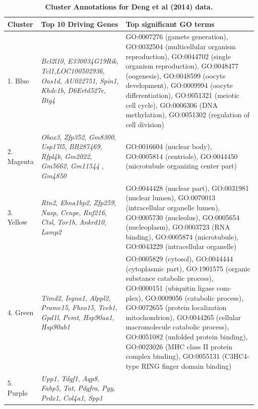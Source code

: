 \documentclass[10pt,letterpaper]{article}
\begin{document}
\begin{table}[!hp]
\begin{adjustwidth}{-2in}{0in} %
\footnotesize
\centering
\caption{\bf Cluster Annotations for Deng et al (2014) data.}
\renewcommand{\arraystretch}{1.7}
\begin{tabular}{|p{1.0in}|p{1.5in}|p{4.3in}|}
\hline
Cluster & Top 10 Driving \qquad Genes &  Top significant GO terms \\
\hline
1. Blue & \textit{Bcl2l10}, \textit{E330034G19Rik}, \textit{Tcl1},\textit{LOC100502936}, \textit{Oas1d}, \textit{AU022751}, \textit{Spin1}, \textit{Khdc1b}, \textit{D6Ertd527e}, \textit{Btg4} & GO:0007276 (gamete generation), GO:0032504 (multicellular organism reproduction), GO:0044702 (single organism reproduction), GO:0048477 (oogenesis), GO:0048599 (oocyte development), GO:0009994 (oocyte differentiation), GO:0051321 (meiotic cell cycle), GO:0006306 (DNA methylation), GO:0051302 (regulation of cell division)\\
\hline
2. Magenta & \textit{Obox3}, \textit{Zfp352}, \textit{Gm8300}, \textit{Usp17l5}, \textit{BB287469}, \textit{Rfpl4b}, \textit{Gm2022}, \textit{Gm5662}, \textit{Gm11544 }, \textit{Gm4850}
& GO:0016604 (nuclear body), GO:0005814 (centriole), GO:0044450 (microtubule organizing center part) \\
\hline
3. Yellow & \textit{Rtn2}, \textit{Ebna1bp2}, \textit{Zfp259}, \textit{Nasp}, \textit{Cenpe}, \textit{Rnf216}, \textit{Ctsl}, \textit{Tor1b}, \textit{Ankrd10}, \textit{Lamp2} & GO:0044428 (nuclear part), GO:0031981 (nuclear lumen), GO:0070013 (intracellular organelle lumen), GO:0005730 (nucleolus), GO:0005654 (nucleoplasm),  GO:0003723 (RNA binding), GO:0005874 (microtubule), GO:0043229 (intracellular organelle)\\
\hline
4. Green
&  \textit{Timd2}, \textit{Isyna1}, \textit{Alppl2}, \textit{Prame15},  \textit{Fbxo15}, \textit{Tceb1}, \textit{Gpd1l}, \textit{Pemt}, \textit{Hsp90aa1}, \textit{Hsp90ab1}
& GO:0005829 (cytosol), GO:0044444 (cytoplasmic part), GO:1901575 (organic substance catabolic process), GO:0000151 (ubiquitin ligase com- plex),  GO:0009056 (catabolic process), GO:0072655 (protein localization mitochondrion), GO:0044265 (cellular macromolecule catabolic process), GO:0051082 (unfolded protein binding), GO:0023026 (MHC class II protein complex binding), GO:0055131 (C3HC4-type RING finger domain binding) \\
\hline
5. Purple & \textit{Upp1}, \textit{Tdgf1}, \textit{Aqp8}, \textit{Fabp5}, \textit{Tat}, \textit{Pdgfra}, \textit{Pyy}, \textit{Prdx1}, \textit{Col4a1}, \textit{Spp1}

\end{tabular}
\end{adjustwidth}
\end{table}
\end{document}
